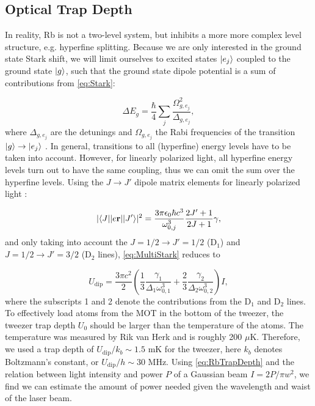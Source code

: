 \subsection{Optical Trap Depth}

In reality, Rb is not a two-level system, but inhibits a more more complex level structure, e.g. hyperfine splitting.
Because we are only interested in the ground state Stark shift, we will limit ourselves to excited states $\lvert e_j\rangle$ coupled to the ground state $\lvert g\rangle$, such that the ground state dipole potential is a sum of contributions from \cref{eq:Stark}:

\begin{equation}\label{eq:MultiStark}
    \Delta E_{g} = \frac{\hbar}{4} \sum_j \frac{\Omega_{g,e_j}^2}{\Delta_{g,e_j}},
\end{equation}
where $\Delta_{g,e_j}$ are the detunings and $\Omega_{g,e_j}$ the Rabi frequencies of the transition $\lvert g\rangle \rightarrow \lvert e_j\rangle$ \cite{Brossard2020}. 
In general, transitions to all (hyperfine) energy levels have to be taken into account. 
However, for linearly polarized light, all hyperfine energy levels turn out to have the same coupling, thus we can omit the sum over the hyperfine levels. Using the $J \rightarrow J'$ dipole matrix elements for linearly polarized light \cite{Steck2008}:

\begin{equation}
    |\langle J\rvert | e \mathbf{r} | \lvert J'\rangle|^2 = \frac{3 \pi \epsilon_0 \hbar c^3}{\omega_{0,j}^3} \frac{2J'+1}{2J+1} \gamma,
\end{equation}
and only taking into account the $J=1/2 \rightarrow J'=1/2$ (D$_1$) and $J=1/2 \rightarrow J'=3/2$ (D$_2$ lines), \cref{eq:MultiStark} reduces to

\begin{equation}\label{eq:RbTrapDepth}
    U_{\text{dip}} = \frac{3\pi c^2}{2} \left(
    \frac{1}{3}\frac{\gamma_1}{\Delta_1 \omega_{0,1}^3} + \frac{2}{3}\frac{ \gamma_2}{\Delta_2 \omega_{0,2}^3} 
    \right) I,
\end{equation}
where the subscripts 1 and 2 denote the contributions from the D$_1$ and D$_2$ lines. 
To effectively load atoms from the MOT in the bottom of the tweezer, the tweezer trap depth $U_0$ should be larger than the temperature of the atoms. 
The temperature was measured by Rik van Herk \cite{Herk2022} and is roughly 200 $\mu$K.
Therefore, we used a trap depth of $U_{\text{dip}} /k_b \sim 1.5$ mK for the tweezer, here $k_b$ denotes Boltzmann's constant, or $U_{\text{dip}} / h \sim 30$ MHz.
Using \cref{eq:RbTrapDepth} and the relation between light intensity and power $P$ of a Gaussian beam $I = 2P/\pi w^2$, we find we can estimate the amount of power needed given the wavelength and waist of the laser beam. 

